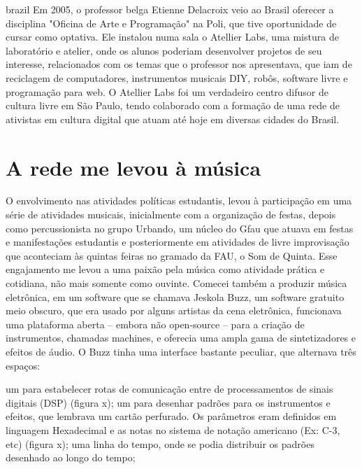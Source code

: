 \begin{otherlanguage*}{brazil}
Em 2005, o professor belga Etienne Delacroix veio ao Brasil oferecer a disciplina "Oficina de Arte e Programação" na Poli, que tive oportunidade de cursar como optativa. Ele instalou numa sala o Atellier Labs, uma mistura de laboratório e atelier, onde os alunos poderiam desenvolver projetos de seu interesse, relacionados com os temas que o professor nos apresentava, que iam de reciclagem de computadores, instrumentos musicais DIY, robôs, software livre e programação para web. O Atellier Labs foi um verdadeiro centro difusor de cultura livre em São Paulo, tendo colaborado com a formação de uma rede de ativistas em cultura digital que atuam até hoje em diversas cidades do Brasil. 

\section{A rede me levou à música}
O envolvimento nas atividades políticas estudantis, levou à participação em uma série de atividades musicais, inicialmente com a organização de festas, depois como percussionista no grupo Urbando, um núcleo do Gfau que atuava em festas e manifestações estudantis e posteriormente em atividades de livre improvisação que aconteciam às quintas feiras no gramado da FAU, o Som de Quinta. Esse engajamento me levou a uma paixão pela música como atividade prática e cotidiana, não mais somente como ouvinte. 
Comecei também a produzir música eletrônica, em um software que se chamava Jeskola Buzz, um software gratuito meio obscuro, que era usado por alguns artistas da cena eletrônica, funcionava uma plataforma aberta – embora não open-source – para a criação de instrumentos, chamadas machines, e oferecia uma ampla gama de sintetizadores e efeitos de áudio. O Buzz tinha uma interface bastante peculiar, que alternava três espaços:

um para estabelecer rotas de comunicação entre de processamentos de sinais digitais (DSP) (figura x);
um para desenhar padrões para os instrumentos e efeitos, que lembrava um cartão perfurado. Os parâmetros eram definidos em linguagem Hexadecimal e as notas no sistema de notação americano (Ex: C-3, etc) (figura x);
uma linha do tempo, onde se podia distribuir os padrões desenhado ao longo do tempo;


\end{otherlanguage*}
